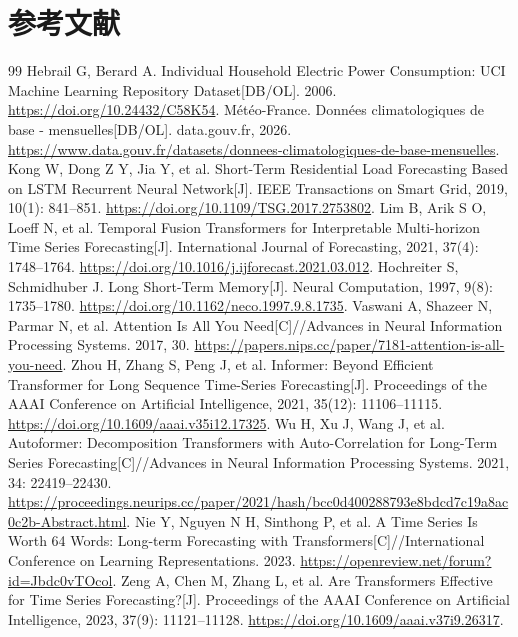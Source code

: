 \documentclass[12pt,a4paper]{ctexart}
\begin{document}
\section*{参考文献}
\begingroup
\renewcommand{\bibsection}{}
\begin{thebibliography}{99}
   Hebrail G, Berard A. Individual Household Electric Power Consumption: UCI Machine Learning Repository Dataset[DB/OL]. 2006. \url{https://doi.org/10.24432/C58K54}.
   Météo-France. Données climatologiques de base - mensuelles[DB/OL]. data.gouv.fr, 2026. \url{https://www.data.gouv.fr/datasets/donnees-climatologiques-de-base-mensuelles}.
   Kong W, Dong Z Y, Jia Y, et al. Short-Term Residential Load Forecasting Based on LSTM Recurrent Neural Network[J]. IEEE Transactions on Smart Grid, 2019, 10(1): 841--851. \url{https://doi.org/10.1109/TSG.2017.2753802}.
   Lim B, Arik S O, Loeff N, et al. Temporal Fusion Transformers for Interpretable Multi-horizon Time Series Forecasting[J]. International Journal of Forecasting, 2021, 37(4): 1748--1764. \url{https://doi.org/10.1016/j.ijforecast.2021.03.012}.
   Hochreiter S, Schmidhuber J. Long Short-Term Memory[J]. Neural Computation, 1997, 9(8): 1735--1780. \url{https://doi.org/10.1162/neco.1997.9.8.1735}.
   Vaswani A, Shazeer N, Parmar N, et al. Attention Is All You Need[C]//Advances in Neural Information Processing Systems. 2017, 30. \url{https://papers.nips.cc/paper/7181-attention-is-all-you-need}.
   Zhou H, Zhang S, Peng J, et al. Informer: Beyond Efficient Transformer for Long Sequence Time-Series Forecasting[J]. Proceedings of the AAAI Conference on Artificial Intelligence, 2021, 35(12): 11106--11115. \url{https://doi.org/10.1609/aaai.v35i12.17325}.
   Wu H, Xu J, Wang J, et al. Autoformer: Decomposition Transformers with Auto-Correlation for Long-Term Series Forecasting[C]//Advances in Neural Information Processing Systems. 2021, 34: 22419--22430. \url{https://proceedings.neurips.cc/paper/2021/hash/bcc0d400288793e8bdcd7c19a8ac0c2b-Abstract.html}.
   Nie Y, Nguyen N H, Sinthong P, et al. A Time Series Is Worth 64 Words: Long-term Forecasting with Transformers[C]//International Conference on Learning Representations. 2023. \url{https://openreview.net/forum?id=Jbdc0vTOcol}.
   Zeng A, Chen M, Zhang L, et al. Are Transformers Effective for Time Series Forecasting?[J]. Proceedings of the AAAI Conference on Artificial Intelligence, 2023, 37(9): 11121--11128. \url{https://doi.org/10.1609/aaai.v37i9.26317}.
\end{thebibliography}
\endgroup
\end{document}
